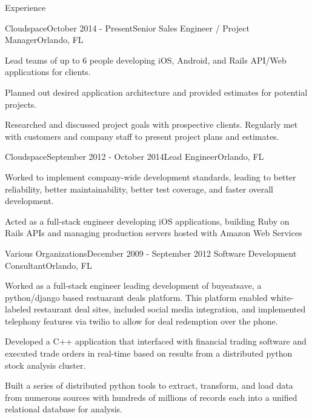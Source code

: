 \documentclass{resume} %
\begin{document}
\begin{rSection}{Experience}


\begin{rSubsection}{Cloudspace}{October 2014 - Present}{Senior Sales Engineer / Project Manager}{Orlando, FL}

\item Lead teams of up to 6 people developing iOS, Android, and Rails API/Web applications for clients.
\item Planned out desired application architecture and provided estimates for potential projects.
\item Researched and discussed project goals with prospective clients. Regularly met with customers and company staff to present project plans and estimates.

\end{rSubsection}




\begin{rSubsection}{Cloudspace}{September 2012 - October 2014}{Lead Engineer}{Orlando, FL}

\item Worked to implement company-wide development standards, leading to better reliability, better maintainability, better test coverage, and faster overall development.
\item Acted as a full-stack engineer developing iOS applications, building Ruby on Rails APIs and managing production servers hosted with Amazon Web Services

\end{rSubsection}


\begin{rSubsection}{Various Organizations}{December 2009 - September 2012}{ Software Development Consultant}{Orlando, FL}

\item Worked as a full-stack engineer leading development of buyeatsave, a python/django based restuarant deals platform.  This platform enabled white-labeled restaurant deal sites, included social media integration, and implemented telephony features via twilio to allow for deal redemption over the phone.
\item Developed a C++ application that interfaced with financial trading software and executed trade orders in real-time based on results from a distributed python stock analysis cluster.
\item Built a series of distributed python tools to extract, transform, and load data from numerous sources with hundreds of millions of records each into a unified relational database for analysis.



\end{rSubsection}
\end{rSection}
\end{document}
